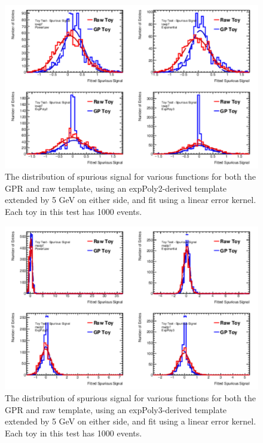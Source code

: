 \begin{figure} 
\begin{center}
  \includegraphics[width=\textwidth]{figures/background/gpr/validation/linear/ToyTest_FitSigVals_lowpT_1000_noSig}   
\caption{The distribution of spurious signal for various functions for both the GPR and raw template, using an expPoly2-derived template extended by 5 GeV on either side, and fit using a linear error kernel. Each toy in this test has 1000 events.}
\label{fig:linearkernel_lowpt_1000_noSig}
\end{center}
\end{figure}

\begin{figure} 
\begin{center}
  \includegraphics[width=\textwidth]{figures/background/gpr/validation/linear/ToyTest_FitSigVals_medpT_1000_noSig}   
\caption{The distribution of spurious signal for various functions for both the GPR and raw template, using an expPoly3-derived template extended by 5 GeV on either side, and fit using a linear error kernel. Each toy in this test has 1000 events.}
\label{fig:linearkernel_medpt_1000_noSig}
\end{center}
\end{figure}

